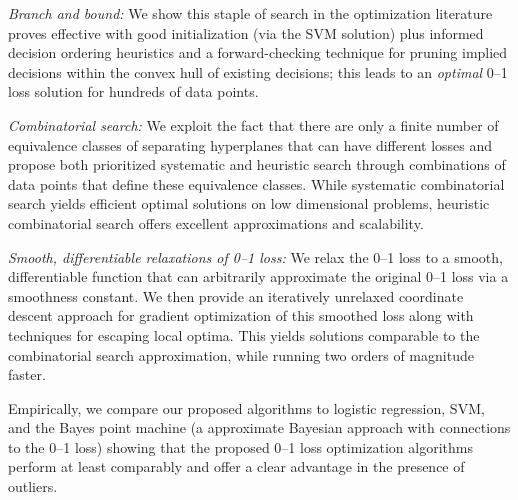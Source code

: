 \noindent\emph{Branch and bound:} We show this staple of search in the
optimization literature proves effective with good initialization (via
the SVM solution) plus informed decision ordering heuristics and a
forward-checking technique for pruning implied decisions within the
convex hull of existing decisions; this leads to an \emph{optimal}
0--1 loss solution for hundreds of data points.

\noindent\emph{Combinatorial search:} We exploit the fact that there
are only a finite number of equivalence classes of separating
hyperplanes that can have different losses and propose both
prioritized systematic and heuristic search through combinations of
data points that define these equivalence classes.  While systematic
combinatorial search yields efficient optimal solutions on low
dimensional problems, heuristic combinatorial search offers excellent
approximations and scalability.

\noindent\emph{Smooth, differentiable relaxations of 0--1 loss:} We
relax the 0--1 loss to a smooth, differentiable function that can
arbitrarily approximate the original 0--1 loss via a smoothness
constant.  We then provide an iteratively unrelaxed coordinate descent
approach for gradient optimization of this smoothed loss along with
techniques for escaping local optima.  This yields solutions
comparable to the combinatorial search approximation, while running
two orders of magnitude faster.

Empirically, we compare our proposed algorithms to logistic
regression, SVM, and the Bayes point machine (a approximate Bayesian
approach with connections to the 0--1 loss) showing that the proposed
0--1 loss optimization algorithms perform at least comparably and
offer a clear advantage in the presence of outliers.  

